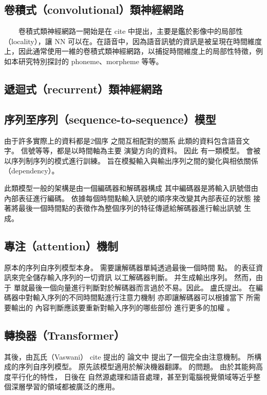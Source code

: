 \subsection{卷積式（convolutional）類神經網路}

　　卷積式類神經網路一開始是在 cite 中提出，主要是鑑於影像中的局部性（locality），讓 NN 可以在。在語音中，因為語音訊號的資訊是被呈現在時間維度上，因此通常使用一維的卷積式類神經網路，以捕捉時間維度上的局部性特徵，例如本研究特別探討的 phoneme、morpheme 等等。

\subsection{遞迴式（recurrent）類神經網路}

\subsection{
    序列至序列（sequence-to-sequence）模型}
    
    由于許多實際上的資料都是2個序 之間互相配對的關系 此類的資料包含語音文字。 信號等等，都是以時間軸為主要 演變方向的資料。 因此 有一類模型。 會被以序列制序列的模式進行訓練。 旨在模擬輸入與輸出序列之間的變化與相依關係（dependency）。

此類模型一般的架構是由一個編碼器和解碼器構成 其中編碼器是將輸入訊號借由內部表征進行編碼。 依據每個時間點輸入訊號的順序來改變其內部表征的狀態 接著將最後一個時間點的表徵作為整個序列的特征傳遞給解碼器進行輸出訊號 生成。 
    
\subsection{專注（attention）機制}
    
    原本的序列自序列模型本身。 需要讓解碼器單純透過最後一個時間 點。 的表征資訊來完全儲存輸入序列的一切資訊 以工解碼器判斷。 并生成輸出序列。 然而，由于 單就最後一個向量進行判斷對於解碼器而言過於不易。因此。 盧氏提出。 在編碼器中對輸入序列的不同時間點進行注意力機制 亦即讓解碼器可以根據當下 所需要輸出的 內容判斷應該要重新對輸入序列的哪些部份 進行更多的加權 。

    

\subsection{轉換器（Transformer）}

其後，由瓦氏（Vaswani） cite 提出的 論文中 提出了一個完全由注意機制。 所構成的序列自序列模型。 原先該模型適用於解決機器翻譯。 的問題。
由於其能夠高度平行化的特性， 日後在 自然源處理和語音處理，甚至到電腦視覺領域等近乎整個深層學習的領域都被廣泛的應用。  


